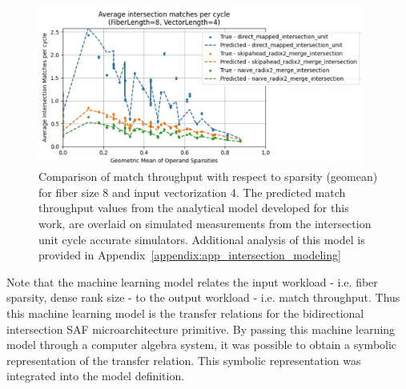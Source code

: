 \begin{figure}[ht]
    \centering
    \includegraphics[width=0.95\textwidth]{figures/isect_model_fl8_vl4.pdf}
    \caption{Comparison of match throughput with respect to sparsity (geomean) for fiber size 8 and input vectorization 4. The predicted match throughput values from the analytical model developed for this work, are overlaid on simulated measurements from the intersection unit cycle accurate simulators. Additional analysis of this model is provided in Appendix~\ref{appendix:app_intersection_modeling}}
    \label{fig:isect_model_fl8_vl4}
\end{figure}

Note that the machine learning model relates the input workload - i.e. fiber sparsity, dense rank size - to the output workload - i.e. match throughput. Thus this machine learning model is the transfer relations for the bidirectional intersection SAF microarchitecture primitive. By passing this machine learning model through a computer algebra system, it was possible to obtain a symbolic representation of the transfer relation. This symbolic representation was integrated into the model definition.